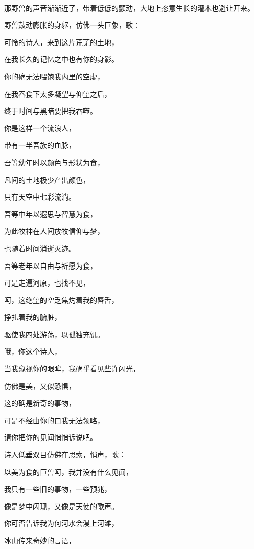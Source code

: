 \documentclass[UTF8]{article}
\begin{document}
\\[0.6cm]
\par 那野兽的声音渐渐近了，带着低低的颤动，大地上恣意生长的灌木也避让开来。
\\[0.6cm]
\par 野兽鼓动膨胀的身躯，仿佛一头巨象，歌：
\\[0.6cm]
\par 可怜的诗人，来到这片荒芜的土地，
\par 在我长久的记忆之中也有你的身影。
\par 你的确无法喂饱我内里的空虚，
\par 在我吞食下太多凝望与仰望之后，
\par 终于时间与黑暗要把我吞噬。
\par 你是这样一个流浪人，
\par 带有一半吾族的血脉，
\par 吾等幼年时以颜色与形状为食，
\par 凡间的土地极少产出颜色，
\par 只有天空中七彩流淌。
\par 吾等中年以遐思与智慧为食，
\par 为此牧神在人间放牧信仰与梦，
\par 也随着时间消逝灭迹。
\par 吾等老年以自由与祈愿为食，
\par 可是走遍河原，也找不见，
\par 呵，这绝望的空乏焦灼着我的唇舌，
\par 挣扎着我的腑脏，
\par 驱使我四处游荡，以孤独充饥。
\par 哦，你这个诗人，
\par 当我窥视你的眼眸，我确乎看见些许闪光，
\par 仿佛是美，又似恐惧，
\par 这的确是新奇的事物，
\par 可是不经由你的口我无法领略，
\par 请你把你的见闻悄悄诉说吧。
\\[0.6cm]
\par 诗人低垂双目仿佛在思索，悄声，歌：
\\[0.6cm]
\par 以美为食的巨兽呵，我并没有什么见闻，
\par 我只有一些旧的事物，一些预兆，
\par 像是梦中闪现，又像是天使的歌声。
\par 你可否告诉我为何河水会漫上河滩，
\par 冰山传来奇妙的言语，
\end{document}
